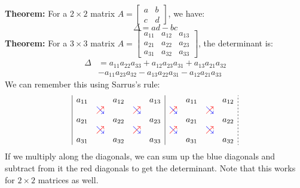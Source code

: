 \documentclass{article}
\begin{document}
\begin{minipage}[t]{.45\linewidth}
        \textbf{Theorem:} For a $2\times 2$ matrix $A = \begin{bmatrix}
            a&b\\c&d
        \end{bmatrix}$, we have:
        \begin{equation*}
            \Delta = ad-bc
        \end{equation*}
        \textbf{Theorem:} For a $3 \times 3$ matrix $A = \begin{bmatrix}
            a_{11} & a_{12} & a_{13} \\ 
            a_{21} & a_{22} & a_{23} \\ 
            a_{31} & a_{32} & a_{33}
        \end{bmatrix}$, the determinant is:
        \begin{align*}
            \Delta &= a_{11}a_{22}a_{33}+a_{12}a_{23}a_{31}+a_{13}a_{21}a_{32} \\ 
            &-a_{11}a_{23}a_{32}-a_{13}a_{22}a_{31} - a_{12}a_{21}a_{33}
        \end{align*}
        We can remember this using Sarrus's rule:
        \begin{equation*}
            \begin{array}{|ccccc|cccc;{2pt/2pt}}
                a_{11} & & a_{12} && a_{13} &&a_{11}&&a_{12} \\ 
                &\mathrlap{\textcolor{blue}{\searrow}}\textcolor{red}{\nearrow} &&\mathrlap{\textcolor{blue}{\searrow}}\textcolor{red}{\nearrow}&&\mathrlap{\textcolor{blue}{\searrow}}\textcolor{red}{\nearrow}&&\mathrlap{\textcolor{blue}{\searrow}}\textcolor{red}{\nearrow}& \\ 
                a_{21} & & a_{22} && a_{23} &&a_{21}&&a_{22} \\ 
                &\mathrlap{\textcolor{blue}{\searrow}}\textcolor{red}{\nearrow} &&\mathrlap{\textcolor{blue}{\searrow}}\textcolor{red}{\nearrow}&&\mathrlap{\textcolor{blue}{\searrow}}\textcolor{red}{\nearrow}&&\mathrlap{\textcolor{blue}{\searrow}}\textcolor{red}{\nearrow}& \\ 
                a_{31} & & a_{32} && a_{33} &&a_{31}&&a_{32} \\ 
            \end{array}
        \end{equation*}
        If we multiply along the diagonals, we can sum up the blue diagonals and subtract from it the red diagonals to get the determinant. Note that this works for $2\times 2$ matrices as well.
        \vspace{2mm}


\end{minipage}
\end{document}
